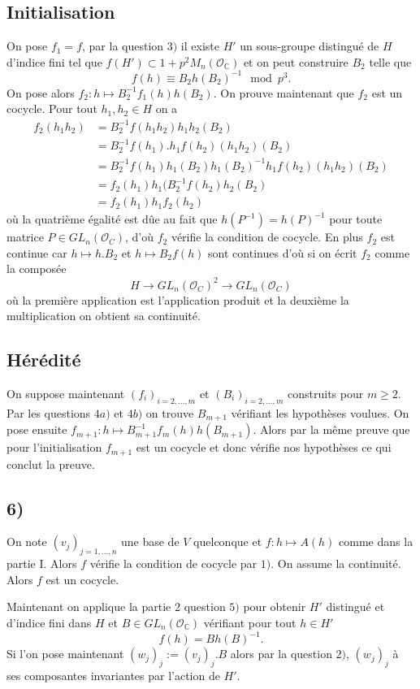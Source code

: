 \documentclass[a4paper,12pt]{article}
\newcommand{\C}{\mathbb{C}}
\newcommand{\Or}{\mathcal{O}}
\theoremstyle{plain}
\theoremstyle{definition}
\theoremstyle{remark}
\begin{document}
\subsection*{Initialisation}
On pose $f_1=f$, par
la question $3)$ il existe $H'$ un sous-groupe distingué de $H$
d'indice fini tel que $f(H')\subset 1+p^2M_n(\Or_\C)$ et on peut
construire $B_2$ telle que 
\[f(h)\equiv B_2h(B_2)^{-1}\mod p^3.\]
On pose alors $f_2:h\mapsto B_2^{-1}f_1(h)h(B_2)$. On prouve 
maintenant que $f_2$ est un cocycle. Pour tout $h_1,h_2\in H$
on a 
\begin{align*}
  f_2(h_1h_2)&=B_2^{-1}f(h_1h_2)h_1h_2(B_2)\\
	     &=B_2^{-1}f(h_1).h_1f(h_2)(h_1h_2)(B_2)\\
	     &=B_2^{-1}f(h_1)h_1(B_2)h_1(B_2)^{-1}h_1f(h_2)(h_1h_2)(B_2)\\
	     &=f_2(h_1)h_1(B_2^{-1}f(h_2)h_2(B_2)\\
	     &=f_2(h_1)h_1f_2(h_2)
\end{align*}
où la quatrième égalité est dûe au fait que $h(P^{-1})=h(P)^{-1}$
pour toute matrice $P\in GL_n(\Or_C)$, d'où $f_2$ vérifie la 
condition de cocycle. En plus $f_2$ est 
continue car $h\mapsto h.B_2$ et $h\mapsto B_2f(h)$ sont continues
d'où si on écrit $f_2$ comme la composée
\[H\to GL_n(\Or_C)^2\to GL_n(\Or_C)\]
où la première application est l'application produit et la deuxième
la multiplication on obtient sa continuité.
\subsection*{Hérédité}
On suppose maintenant $(f_i)_{i=2,\ldots, m}$ et 
$(B_i)_{i=2,\ldots,m}$ construits pour $m\geq 2$. Par les questions
$4a)$ et $4b)$ on trouve $B_{m+1}$ vérifiant les hypothèses 
voulues. On pose ensuite 
$f_{m+1}:h\mapsto B_{m+1}^{-1}f_m(h)h(B_{m+1})$. Alors par la
même preuve que pour l'initialisation
$f_{m+1}$ est un cocycle et donc vérifie nos hypothèses ce qui
conclut la preuve.

\subsection*{6)}
On note $(v_j)_{j=1,\ldots, n}$ une base de $V$ quelconque et 
$f\colon h\mapsto A(h)$ comme dans la partie I. Alors $f$ vérifie
la condition de cocycle par $1)$. On assume la continuité. Alors
$f$ est un cocycle.

Maintenant on applique la partie $2$ question $5)$ pour obtenir
$H'$ distingué et d'indice fini dans $H$ et $B\in GL_n(\Or_\C)$
vérifiant pour tout $h\in H'$ 
\[f(h)=Bh(B)^{-1}.\]
Si l'on pose maintenant $(w_j)_j:=(v_j)_j.B$ alors par la question
$2)$, $(w_j)_j$ à ses composantes invariantes par l'action de $H'$.
\end{document}

